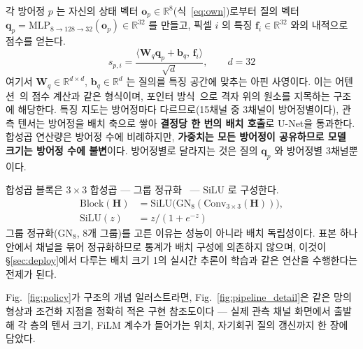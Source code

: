 각 방어정 $p$ 는 자신의 상태 벡터 $\mathbf{o}_p \in \mathbb{R}^8$(식~\eqref{eq:own})로부터
질의 벡터 $\mathbf{q}_p = \mathrm{MLP}_{8 \to 128 \to 32}(\mathbf{o}_p) \in \mathbb{R}^{32}$ 를
만들고, 픽셀 $i$ 의 특징 $\mathbf{f}_i \in \mathbb{R}^{32}$ 와의 내적으로 점수를 얻는다.
\begin{equation}
s_{p,i} = \frac{\langle \mathbf{W}_q \mathbf{q}_p + \mathbf{b}_q,\, \mathbf{f}_i \rangle}{\sqrt{d}}, \qquad d = 32
\label{eq:score}
\end{equation}
여기서 $\mathbf{W}_q \in \mathbb{R}^{d \times d}$, $\mathbf{b}_q \in \mathbb{R}^{d}$ 는 질의를 특징 공간에 맞추는 아핀 사영이다.
이는 어텐션~\citep{vaswani2017attention}의 점수 계산과 같은 형식이며, 포인터
방식~\citep{vinyals2015pointer}으로 격자 위의 원소를 지목하는 구조에 해당한다. 특징 지도는
방어정마다 다르므로(15채널 중 3채널이 방어정별이다), 관측 텐서는 방어정을 배치 축으로
쌓아 \textbf{결정당 한 번의 배치 호출}로 U-Net을 통과한다. 합성곱 연산량은 방어정 수에
비례하지만, \textbf{가중치는 모든 방어정이 공유하므로 모델 크기는 방어정 수에 불변}이다.
방어정별로 달라지는 것은 질의 $\mathbf{q}_p$ 와 방어정별 3채널뿐이다.

합성곱 블록은 $3\times3$ 합성곱 --- 그룹 정규화~\citep{wu2018groupnorm} --- SiLU 로 구성한다.
\begin{equation}
\begin{aligned}
\mathrm{Block}(\mathbf{H}) &= \mathrm{SiLU}\big(\mathrm{GN}_{8}(\mathrm{Conv}_{3\times3}(\mathbf{H}))\big),\\
\mathrm{SiLU}(z) &= z / (1 + e^{-z})
\end{aligned}
\label{eq:block}
\end{equation}
그룹 정규화($\mathrm{GN}_8$, 8개 그룹)를 고른 이유는 성능이 아니라 배치 독립성이다. 표본
하나 안에서 채널을 묶어 정규화하므로 통계가 배치 구성에 의존하지 않으며, 이것이
\S\ref{sec:deploy}에서 다루는 배치 크기 1의 실시간 추론이 학습과 같은 연산을 수행한다는
전제가 된다.

Fig.~\ref{fig:policy}가 구조의 개념 일러스트라면, Fig.~\ref{fig:pipeline_detail}은
같은 망의 형상과 조건화 지점을 정확히 적은 구현 참조도이다 --- 실제 관측 채널 화면에서
출발해 각 층의 텐서 크기, FiLM 계수가 들어가는 위치, 자기회귀 질의 갱신까지 한 장에 담았다.

